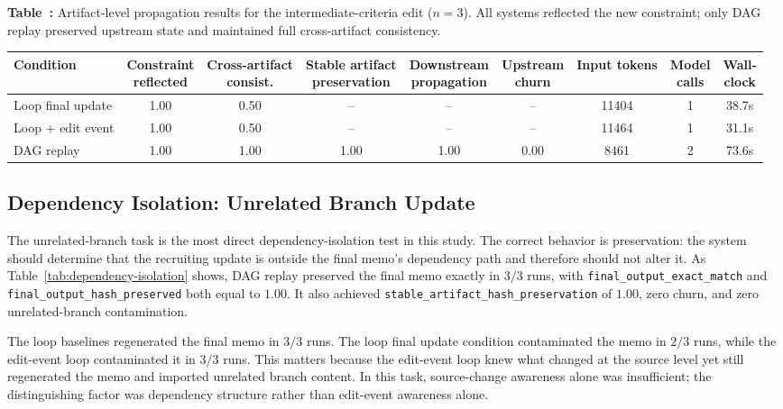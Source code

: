 \documentclass{article}
\begin{document}
\begin{table}[H]
\centering
\footnotesize
{}
\textbf{Table~\thetable:} Artifact-level propagation results for the intermediate-criteria edit ($n=3$). All systems reflected the new constraint; only DAG replay preserved upstream state and maintained full cross-artifact consistency.\par\vspace{4pt}
\label{tab:artifact-propagation}
\begin{tabular}{lcccccccc}
\toprule
Condition & \shortstack{Constraint\\reflected} & \shortstack{Cross-artifact\\consist.} & \shortstack{Stable artifact\\preservation} & \shortstack{Downstream\\propagation} & \shortstack{Upstream\\churn} & Input tokens & \shortstack{Model\\calls} & \shortstack{Wall-\\clock} \\
\midrule
Loop final update & 1.00 & 0.50 & -- & -- & -- & 11404 & 1 & 38.7s \\
Loop + edit event & 1.00 & 0.50 & -- & -- & -- & 11464 & 1 & 31.1s \\
DAG replay & 1.00 & 1.00 & 1.00 & 1.00 & 0.00 & 8461 & 2 & 73.6s \\
\bottomrule
\end{tabular}
\end{table}
\endgroup

\subsection{Dependency Isolation: Unrelated Branch Update}

The unrelated-branch task is the most direct dependency-isolation test in this study. The correct behavior is preservation: the system should determine that the recruiting update is outside the final memo's dependency path and therefore should not alter it. As Table~\ref{tab:dependency-isolation} shows, DAG replay preserved the final memo exactly in $3/3$ runs, with \texttt{final\_output\_exact\_match} and \texttt{final\_output\_hash\_preserved} both equal to $1.00$. It also achieved \texttt{stable\_artifact\_hash\_preservation} of $1.00$, zero churn, and zero unrelated-branch contamination.

The loop baselines regenerated the final memo in $3/3$ runs. The loop final update condition contaminated the memo in $2/3$ runs, while the edit-event loop contaminated it in $3/3$ runs. This matters because the edit-event loop knew what changed at the source level yet still regenerated the memo and imported unrelated branch content. In this task, source-change awareness alone was insufficient; the distinguishing factor was dependency structure rather than edit-event awareness alone.
\end{document}
